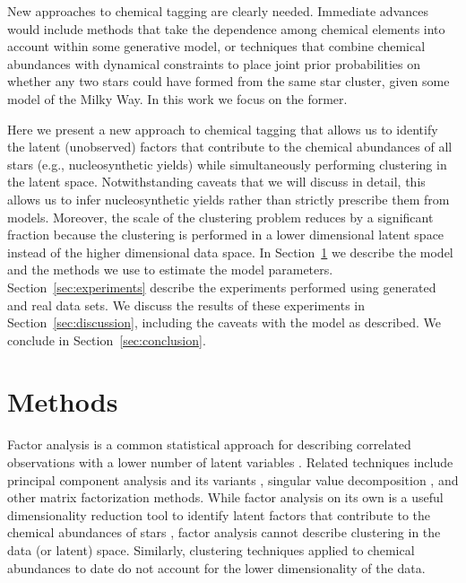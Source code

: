 \documentclass[twocolumn]{aastex62}
\begin{document}
New approaches to chemical tagging are clearly needed. Immediate advances would
include methods that take the dependence among chemical elements into account
within some generative model, or techniques that combine chemical abundances
with dynamical constraints to place joint prior probabilities on whether any
two stars could have formed from the same star cluster, given some model of the
Milky Way. In this work we focus on the former. 

Here we present a new approach to chemical tagging that allows us to identify 
the latent (unobserved) factors that contribute to the chemical abundances of 
all stars (e.g., nucleosynthetic yields) while simultaneously performing 
clustering in the latent space. Notwithstanding caveats that we will
discuss in detail, this allows us to infer nucleosynthetic yields rather than
strictly prescribe them from models. Moreover, the scale of the clustering
problem reduces by a significant fraction because the clustering is performed in
a lower dimensional latent space instead of the higher dimensional data space.
In Section~\ref{sec:methods} we describe the model and the methods we use to
estimate the model parameters. Section~\ref{sec:experiments} describe the 
experiments performed using generated and real data sets. We discuss the results
of these experiments in Section~\ref{sec:discussion}, including the caveats with
the model as described. We conclude in Section~\ref{sec:conclusion}.



\section{Methods} \label{sec:methods}

Factor analysis is a common statistical approach for describing correlated 
observations with a lower number of latent variables \citep[e.g.,][]{Thompson:2004}.
Related techniques include principal component analysis \citep{Hotelling:1933} and its
variants \citep{Tipping;Bishop:1999}, singular value decomposition \citep{Golub:1970}, and other
matrix factorization methods. While factor analysis on its own is a useful
dimensionality reduction tool to identify latent factors that contribute to
the chemical abundances of stars \citep[e.g.,][]{Price-Jones:2018}, factor
analysis cannot describe clustering in the data (or latent) space.
Similarly, clustering techniques applied to chemical abundances to date 
\citep[e.g.,][]{Hogg:2016} do not account for the lower dimensionality of the
data. 
\end{document}
